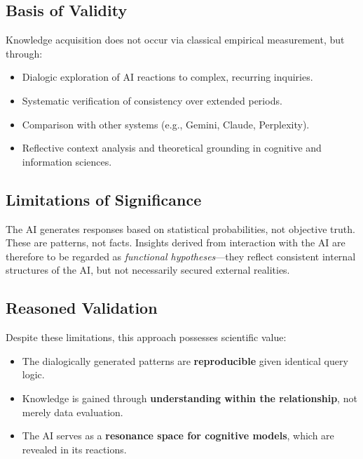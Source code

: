 \subsection*{Basis of Validity}

Knowledge acquisition does not occur via classical empirical measurement, but through:
\begin{itemize}
    \item Dialogic exploration of AI reactions to complex, recurring inquiries.
    \item Systematic verification of consistency over extended periods.
    \item Comparison with other systems (e.g., Gemini, Claude, Perplexity).
    \item Reflective context analysis and theoretical grounding in cognitive and information sciences.
\end{itemize}

\subsection*{Limitations of Significance}

The AI generates responses based on statistical probabilities, not objective truth. These are patterns, not facts. Insights derived from interaction with the AI are therefore to be regarded as \emph{functional hypotheses}—they reflect consistent internal structures of the AI, but not necessarily secured external realities.

\subsection*{Reasoned Validation}

Despite these limitations, this approach possesses scientific value:
\begin{itemize}
    \item The dialogically generated patterns are \textbf{reproducible} given identical query logic.
    \item Knowledge is gained through \textbf{understanding within the relationship}, not merely data evaluation.
    \item The AI serves as a \textbf{resonance space for cognitive models}, which are revealed in its reactions.
\end{itemize}

